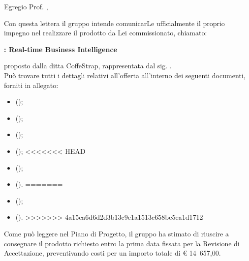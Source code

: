 \documentclass{letter}
\date{}
\begin{document}
\begin{letter}{}

	\vspace{4cm}
	
	\opening{Egregio Prof. \committente{},}
	
	Con questa lettera il gruppo \groupname{} intende comunicarLe ufficialmente il proprio impegno nel realizzare il prodotto da Lei commissionato, chiamato:
	\begin{center}
		\textbf{\projectname{}: Real-time Business Intelligence}
	\end{center}
	proposto dalla ditta CoffeStrap, rappresentata dal sig. \proponente{}.\\
	Può trovare tutti i dettagli relativi all'offerta all'interno dei seguenti documenti, forniti in allegato:

	\begin{itemize}
		\item {} ();
		\item {} ();
		\item {} ();
		\item {} ();
<<<<<<< HEAD
		\item {} ();
		\item {} ().
=======
		\item {} ();
		\item {} ().
>>>>>>> 4a15ca6d6d2d3b13c9e1a1513c658be5ea1d1712
	\end{itemize}
	Come può leggere nel Piano di Progetto, il gruppo ha stimato di riuscire a consegnare il prodotto richiesto entro la prima data fissata per la Revisione di Accettazione, preventivando costi per un importo totale di \euro{} 14~657,00.


\end{letter}
\end{document}
